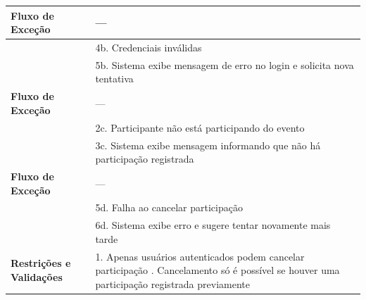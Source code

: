 \documentclass[12pt,a4paper]{article}
\begin{document}
\begin{longtable}{|p{4cm}|p{11cm}|}
\textbf{Fluxo de Exceção} & --- \\ \hline
& 4b. Credenciais inválidas \\ \hline
& 5b. Sistema exibe mensagem de erro no login e solicita nova tentativa \\ \hline
\textbf{Fluxo de Exceção} & --- \\ \hline
& 2c. Participante não está participando do evento \\ \hline
& 3c. Sistema exibe mensagem informando que não há participação registrada \\ \hline
\textbf{Fluxo de Exceção} & --- \\ \hline
& 5d. Falha ao cancelar participação \\ \hline
& 6d. Sistema exibe erro e sugere tentar novamente mais tarde \\ \hline
\textbf{Restrições e Validações} & 1. Apenas usuários autenticados podem cancelar participação \newline 2. Cancelamento só é possível se houver uma participação registrada previamente \\ \hline
\end{longtable}

\vspace{1cm}
\end{document}
